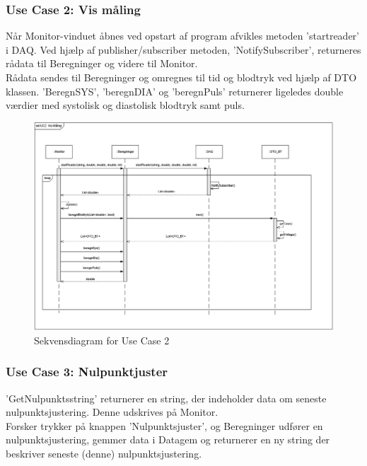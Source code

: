 \subsubsection{Use Case 2: Vis måling}
Når Monitor-vinduet åbnes ved opstart af program afvikles metoden 'startreader' i DAQ. Ved hjælp af publisher/subscriber metoden, 'NotifySubscriber', returneres rådata til Beregninger og videre til Monitor.\\
Rådata sendes til Beregninger og omregnes til tid og blodtryk ved hjælp af DTO klassen.
'BeregnSYS', 'beregnDIA' og 'beregnPuls' returnerer ligeledes double værdier med systolisk og diastolisk blodtryk samt puls.
\begin{figure}[H]
	\centering
	\includegraphics[width=1\textwidth]{Figurer/UC2_SD_SW}
	\caption{Sekvensdiagram for Use Case 2}
\end{figure}

\subsubsection{Use Case 3: Nulpunktjuster}
'GetNulpunktsstring' returnerer en string, der indeholder data om seneste nulpunktsjustering. Denne udskrives på Monitor.\\
Forsker trykker på knappen 'Nulpunktsjuster', og Beregninger udfører en nulpunktsjustering, gemmer data i Datagem og returnerer en ny string der beskriver seneste (denne) nulpunktsjustering.

